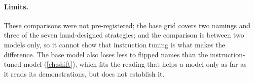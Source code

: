 \paragraph{Limits.}
These comparisons were not pre-registered; the base grid covers two namings and three of the seven hand-designed strategies; and the comparison is between two models only, so it cannot show that instruction tuning is what makes the difference.
The base model also loses less to flipped names than the instruction-tuned model (\autoref{ch:shift}), which fits the reading that \sata helps a model only as far as it reads its demonstrations, but does not establish it.
